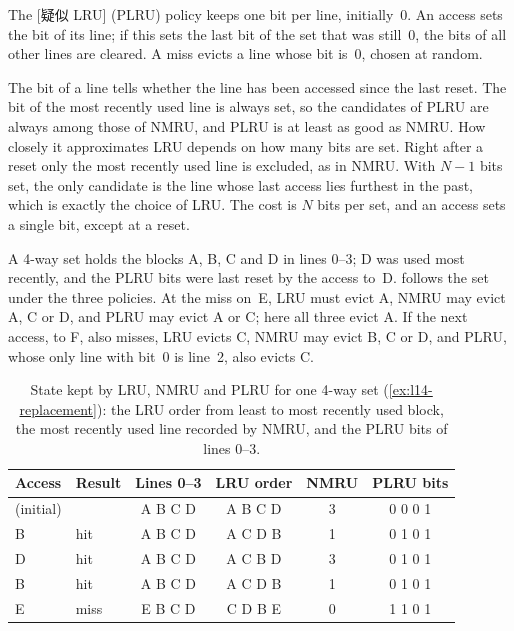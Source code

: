 \documentclass[../main.tex]{subfiles}
\begin{document}
\begin{definition}[PLRU]
  The [疑似 LRU] (PLRU) policy
  keeps one bit per line, initially~0.
  An access sets the bit of its line;
  if this sets the last bit of the set that was still~0, the bits of all
  other lines are cleared.  A miss evicts a line whose bit is~0, chosen at
  random.
\end{definition}

The bit of a line tells whether the line has been accessed since the last
reset.  The bit of the most recently used line is always set, so the
candidates of PLRU are always among those of NMRU, and PLRU is at least as
good as NMRU.  How closely it approximates LRU depends on how many bits are
set.  Right after a reset only the most recently used line is excluded, as
in NMRU.  With $N-1$ bits set, the only candidate is the line whose last
access lies furthest in the past, which is exactly the choice of LRU.  The
cost is $N$ bits per set, and an access sets a single bit, except at a reset.

\begin{example}
  \label{ex:l14-replacement}
  A 4-way set holds the blocks A, B, C and D in lines 0--3; D was used most
  recently, and the PLRU bits were last reset by the access to~D.
   follows the set under the three policies.  At
  the miss on~E, LRU must evict A, NMRU may evict A, C or D, and PLRU may
  evict A or C; here all three evict A.  If the next access, to F, also
  misses, LRU evicts C, NMRU may evict B, C or D, and PLRU, whose only
  line with bit~0 is line~2, also evicts C.
\end{example}

\begin{table}[htbp]
  \centering\small
  \caption{State kept by LRU, NMRU and PLRU for one 4-way set
    (\cref{ex:l14-replacement}): the LRU order from least to most recently
    used block, the most recently used line recorded by NMRU, and the PLRU
    bits of lines 0--3.}
  \label{tab:l14-replacement}
  \begin{tabular}{@{}llcccc@{}}
    \toprule
    Access & Result & Lines 0--3 & LRU order & NMRU & PLRU bits \\
    \midrule
    (initial) &      & A B C D & A B C D & 3 & 0 0 0 1 \\
    B         & hit  & A B C D & A C D B & 1 & 0 1 0 1 \\
    D         & hit  & A B C D & A C B D & 3 & 0 1 0 1 \\
    B         & hit  & A B C D & A C D B & 1 & 0 1 0 1 \\
    E         & miss & E B C D & C D B E & 0 & 1 1 0 1 \\
    \bottomrule
  \end{tabular}
\end{table}
\end{document}

